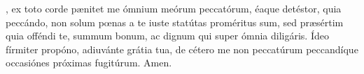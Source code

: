, ex toto corde p{\ae}nitet me ómnium meórum peccatórum, éaque detéstor, quia peccándo, non solum pœnas a te iuste statútas 
proméritus sum, sed pr{\ae}sértim quia offéndi te, summum bonum, ac dignum qui super ómnia diligáris. Ídeo fírmiter propóno, adiuvánte grátia tua, 
de cétero me non peccatúrum peccandíque occasiónes próximas fugitúrum. Amen.